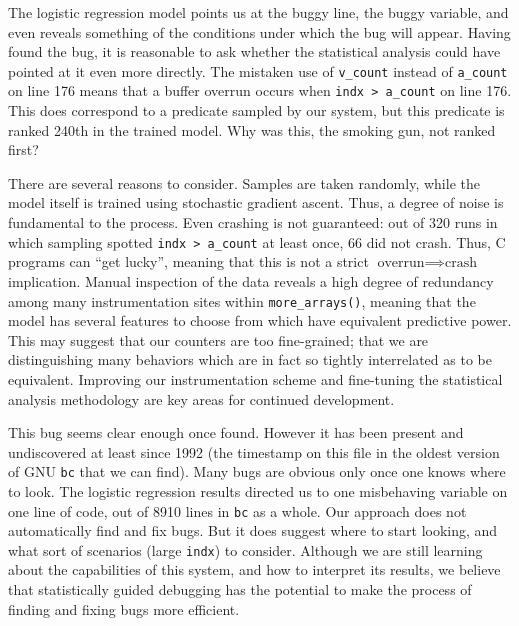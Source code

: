 The logistic regression model points us at the buggy line, the buggy
variable, and even reveals something of the conditions under which the
bug will appear.  Having found the bug, it is reasonable to ask
whether the statistical analysis could have pointed at it even more
directly.  The mistaken use of \texttt{v\_count} instead of
\texttt{a\_count} on line 176 means that a buffer overrun occurs when
\texttt{indx > a\_count} on line 176.  This does correspond to a
predicate sampled by our system, but this predicate is ranked 240th in
the trained model.  Why was this, the smoking gun, not ranked first?

There are several reasons to consider.  Samples are taken randomly,
while the model itself is trained using stochastic gradient ascent.
Thus, a degree of noise is fundamental to the process.  Even crashing
is not guaranteed: out of 320 runs in which sampling spotted
\texttt{indx > a\_count} at least once, 66 did not crash.  Thus, C
programs can ``get lucky'', meaning that this is not a strict
$\text{overrun} \implies \text{crash}$ implication.  Manual inspection
of the data reveals a high degree of redundancy among many
instrumentation sites within \texttt{more\_arrays()}, meaning that the
model has several features to choose from which have equivalent
predictive power.  This may suggest that our counters are too
fine-grained; that we are distinguishing many behaviors which are in
fact so tightly interrelated as to be equivalent.  Improving our
instrumentation scheme and fine-tuning the statistical analysis
methodology are key areas for continued development.



This bug seems clear enough once found.  However it has been present
and undiscovered at least since 1992 (the time\-stamp on this file in
the oldest version of GNU \texttt{bc} that we can find).  Many bugs
are obvious only once one knows where to look.  The logistic
regression results directed us to one misbehaving variable on one line
of code, out of 8910 lines in \texttt{bc} as a whole.  Our approach
does not automatically find and fix bugs.  But it does suggest where
to start looking, and what sort of scenarios (large \texttt{indx}) to
consider.  Although we are still learning about the capabilities of
this system, and how to interpret its results, we believe that
statistically guided debugging has the potential to make the process
of finding and fixing bugs more efficient.

